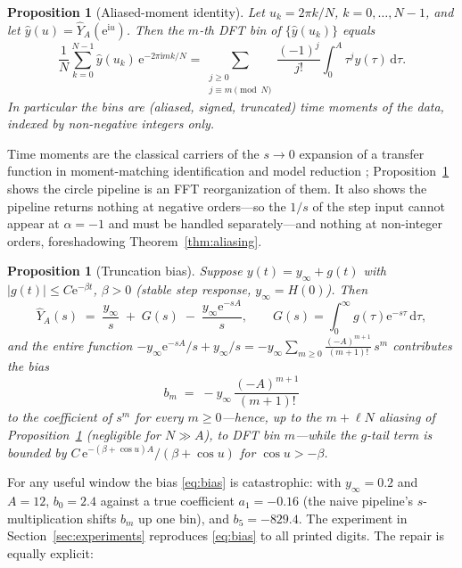 \documentclass[11pt, a4paper]{article}
\newtheorem{proposition}[theorem]{Proposition}
\theoremstyle{definition}
\theoremstyle{remark}
\newcommand{\dd}{\,\mathrm{d}}
\newcommand{\ii}{\mathrm{i}}
\newcommand{\ee}{\mathrm{e}}
\begin{document}
\begin{proposition}[Aliased-moment identity]\label{prop:moments}
Let $u_k=2\pi k/N$, $k=0, \dots,N-1$, and let
$\widehat{y}(u)=\widehat{Y}_{\!A}(\ee^{\ii u})$. Then the $m$-th DFT bin of
$\{\widehat{y}(u_k)\}$ equals
\[
\frac{1}{N} \sum_{k=0}^{N-1} \widehat{y}(u_k) \, \ee^{-2\pi\ii mk/N}
=\sum_{\substack{j\ge0\\ j\equiv m \pmod{N}}}
\frac{(-1)^{j}}{j!}\int_0^{A}\tau^{j}y(\tau) \dd\tau.
\]
In particular the bins are (aliased, signed, truncated) \emph{time moments}
of the data, indexed by non-negative integers only.
\end{proposition}

Time moments are the classical carriers of the $s\to0$ expansion of a
transfer function in moment-matching identification and model reduction
\cite{GibilaroLees1969}; Proposition~\ref{prop:moments} shows the circle
pipeline is an FFT reorganization of them. It also shows the pipeline
returns nothing at negative orders---so the $1/s$ of the step input cannot
appear at $\alpha=-1$ and must be handled separately---and nothing at
non-integer orders, foreshadowing Theorem~\ref{thm:aliasing}.

\begin{proposition}[Truncation bias]\label{prop:bias}
Suppose $y(t)=y_\infty+g(t)$ with $|g(t)|\le C\ee^{-\beta t}$, $\beta>0$
(stable step response, $y_\infty=H(0)$). Then
\[
\widehat{Y}_{\!A}(s)\;=\;\frac{y_\infty}{s}\;+\;G(s) \;-\;
\frac{y_\infty \ee^{-sA}}{s} ,
\qquad G(s)=\int_0^{\infty} g(\tau)\ee^{-s\tau}\dd\tau ,
\]
and the entire function $-y_\infty\ee^{-sA}/s + y_\infty/s
= -y_\infty\sum_{m\ge0}\frac{(-A)^{m+1}}{(m+1)!}\, s^{m}$ contributes the
bias
\begin{equation}\label{eq:bias}
b_m \;=\; -y_\infty \, \frac{(-A)^{m+1}}{(m+1)!}
\end{equation}
to the coefficient of $s^{m}$ for every $m\ge0$---hence, up to the
$m+\ell N$ aliasing of Proposition~\ref{prop:moments} (negligible for
$N\gg A$), to DFT bin $m$---while the $g$-tail term is bounded by
$C\, \ee^{-(\beta+\cos u)A}/(\beta+\cos u)$ for $\cos u>-\beta$.
\end{proposition}

For any useful window the bias \eqref{eq:bias} is catastrophic: with
$y_\infty=0.2$ and $A=12$, $b_0=2.4$ against a true coefficient
$a_1=-0.16$ (the naive pipeline's $s$-multiplication shifts $b_m$ up one
bin), and $b_5=-829.4$. The experiment in
Section~\ref{sec:experiments} reproduces \eqref{eq:bias} to all printed
digits. The repair is equally explicit:
\end{document}
